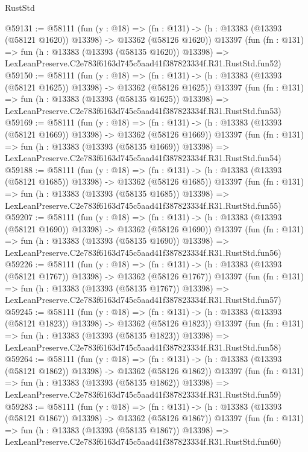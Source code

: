 \begin{lexlean}{RustStd}
\begin{coremodule}
@59131 := @58111
    (fun (y : @18) =>
    (fn : @131) -> (h : @13383 (@13393 (@58121 @1620)) @13398) -> @13362 (@58126 @1620))
    @13397
    (fun (fn : @131) =>
    fun (h : @13383 (@13393 (@58135 @1620)) @13398) =>
    LexLeanPreserve.C2e783f6163d745c5aad41f387823334f.R31.RustStd.fun52)
@59150 := @58111
    (fun (y : @18) =>
    (fn : @131) -> (h : @13383 (@13393 (@58121 @1625)) @13398) -> @13362 (@58126 @1625))
    @13397
    (fun (fn : @131) =>
    fun (h : @13383 (@13393 (@58135 @1625)) @13398) =>
    LexLeanPreserve.C2e783f6163d745c5aad41f387823334f.R31.RustStd.fun53)
@59169 := @58111
    (fun (y : @18) =>
    (fn : @131) -> (h : @13383 (@13393 (@58121 @1669)) @13398) -> @13362 (@58126 @1669))
    @13397
    (fun (fn : @131) =>
    fun (h : @13383 (@13393 (@58135 @1669)) @13398) =>
    LexLeanPreserve.C2e783f6163d745c5aad41f387823334f.R31.RustStd.fun54)
@59188 := @58111
    (fun (y : @18) =>
    (fn : @131) -> (h : @13383 (@13393 (@58121 @1685)) @13398) -> @13362 (@58126 @1685))
    @13397
    (fun (fn : @131) =>
    fun (h : @13383 (@13393 (@58135 @1685)) @13398) =>
    LexLeanPreserve.C2e783f6163d745c5aad41f387823334f.R31.RustStd.fun55)
@59207 := @58111
    (fun (y : @18) =>
    (fn : @131) -> (h : @13383 (@13393 (@58121 @1690)) @13398) -> @13362 (@58126 @1690))
    @13397
    (fun (fn : @131) =>
    fun (h : @13383 (@13393 (@58135 @1690)) @13398) =>
    LexLeanPreserve.C2e783f6163d745c5aad41f387823334f.R31.RustStd.fun56)
@59226 := @58111
    (fun (y : @18) =>
    (fn : @131) -> (h : @13383 (@13393 (@58121 @1767)) @13398) -> @13362 (@58126 @1767))
    @13397
    (fun (fn : @131) =>
    fun (h : @13383 (@13393 (@58135 @1767)) @13398) =>
    LexLeanPreserve.C2e783f6163d745c5aad41f387823334f.R31.RustStd.fun57)
@59245 := @58111
    (fun (y : @18) =>
    (fn : @131) -> (h : @13383 (@13393 (@58121 @1823)) @13398) -> @13362 (@58126 @1823))
    @13397
    (fun (fn : @131) =>
    fun (h : @13383 (@13393 (@58135 @1823)) @13398) =>
    LexLeanPreserve.C2e783f6163d745c5aad41f387823334f.R31.RustStd.fun58)
@59264 := @58111
    (fun (y : @18) =>
    (fn : @131) -> (h : @13383 (@13393 (@58121 @1862)) @13398) -> @13362 (@58126 @1862))
    @13397
    (fun (fn : @131) =>
    fun (h : @13383 (@13393 (@58135 @1862)) @13398) =>
    LexLeanPreserve.C2e783f6163d745c5aad41f387823334f.R31.RustStd.fun59)
@59283 := @58111
    (fun (y : @18) =>
    (fn : @131) -> (h : @13383 (@13393 (@58121 @1867)) @13398) -> @13362 (@58126 @1867))
    @13397
    (fun (fn : @131) =>
    fun (h : @13383 (@13393 (@58135 @1867)) @13398) =>
    LexLeanPreserve.C2e783f6163d745c5aad41f387823334f.R31.RustStd.fun60)

\end{coremodule}
\end{lexlean}
